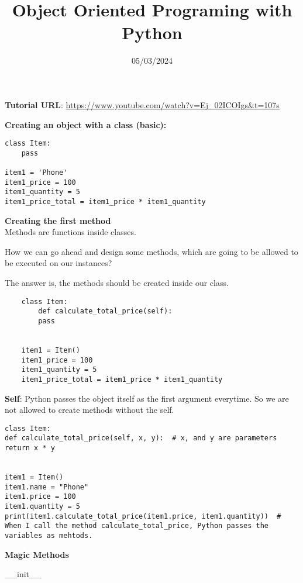 \documentclass{article}
\begin{document}
\title{Object Oriented Programing with Python}
\date{05/03/2024}
\maketitle

\textbf{Tutorial URL}:
\url{https://www.youtube.com/watch?v=Ej_02ICOIgs&t=107s}

\textbf{Creating an object with a class (basic):}
\begin{lstlisting}
class Item:
	pass

item1 = 'Phone'
item1_price = 100
item1_quantity = 5
item1_price_total = item1_price * item1_quantity
\end{lstlisting}

\textbf{Creating the first method}\\
Methods are functions inside classes.

How we can go ahead and design some methods, which are going to be allowed to be executed on our instances?

The answer is, the methods should be created inside our class.

\begin{lstlisting}
	class Item:
		def calculate_total_price(self):
		pass
	
	
	item1 = Item()
	item1_price = 100
	item1_quantity = 5
	item1_price_total = item1_price * item1_quantity
\end{lstlisting}

\textbf{Self}: Python passes the object itself as the first argument everytime. So we are not allowed to create methods without the self. 

\begin{lstlisting}
class Item:
def calculate_total_price(self, x, y):  # x, and y are parameters
return x * y


item1 = Item()
item1.name = "Phone"
item1.price = 100
item1.quantity = 5
print(item1.calculate_total_price(item1.price, item1.quantity))  # When I call the method calculate_total_price, Python passes the variables as mehtods.
\end{lstlisting}

\textbf{Magic Methods}

\_\_init\_\_
\end{document}
